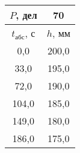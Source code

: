 \begin{tabular}[t]{|c|c|}
\hline
$P$, дел & 70 \\
\hline
$t_{абс}$, с & $h$, мм \\ 
\hline
0,0 & 200,0 \\ 
33,0 & 195,0 \\ 
72,0 & 190,0 \\ 
104,0 & 185,0 \\ 
149,0 & 180,0 \\ 
186,0 & 175,0 \\ 
\hline
\end{tabular}